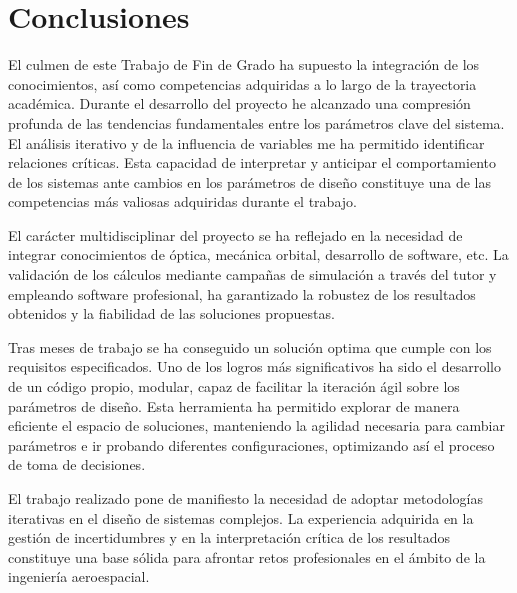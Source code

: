 \chapter{Conclusiones}
El culmen de este Trabajo de Fin de Grado ha supuesto la integración de los conocimientos, así como competencias adquiridas a lo largo de la trayectoria académica. Durante el desarrollo del proyecto he alcanzado una compresión profunda de las tendencias fundamentales entre los parámetros clave del sistema. El análisis iterativo y de la influencia de variables me ha permitido identificar relaciones críticas. Esta capacidad de interpretar y anticipar el comportamiento de los sistemas ante cambios en los parámetros de diseño constituye una de las competencias más valiosas adquiridas durante el trabajo.


El carácter multidisciplinar del proyecto se ha reflejado en la necesidad de integrar conocimientos de óptica, mecánica orbital, desarrollo de software, etc. La validación de los cálculos mediante campañas de simulación a través del tutor y empleando software profesional, ha garantizado la robustez de los resultados obtenidos y la fiabilidad de las soluciones propuestas.

Tras meses de trabajo se ha conseguido un solución optima que cumple con los requisitos especificados. Uno de los logros más significativos ha sido el desarrollo de un código propio, modular, capaz de facilitar la iteración ágil sobre los parámetros de diseño. Esta herramienta ha permitido explorar de manera eficiente el espacio de soluciones, manteniendo la agilidad necesaria para cambiar parámetros e ir probando diferentes configuraciones, optimizando así el proceso de toma de decisiones.

El trabajo realizado pone de manifiesto la necesidad de adoptar metodologías iterativas en el diseño de sistemas complejos. La experiencia adquirida en la gestión de incertidumbres y en la interpretación crítica de los resultados constituye una base sólida para afrontar retos profesionales en el ámbito de la ingeniería aeroespacial.
